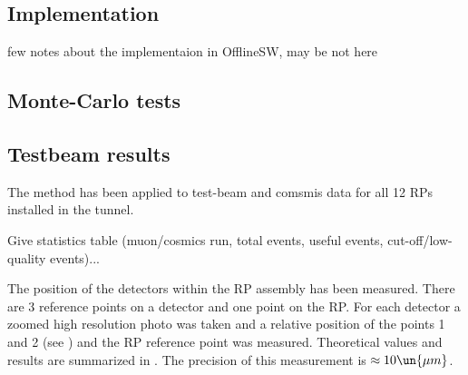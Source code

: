 \subsection{Implementation}

\> few notes about the implementaion in OfflineSW, may be not here

\subsection{Monte-Carlo tests}






\subsection{Testbeam results}

The method has been applied to test-beam and comsmis data for all 12 RPs installed in the tunnel.

Give statistics table (muon/cosmics run, total events, useful events, cut-off/low-quality events)...


The position of the detectors within the RP assembly has been measured. There are 3 reference points on a detector and one point on the RP. For each detector a zoomed high resolution photo was taken and a relative position of the points 1 and 2 (see ) and the RP reference point was measured. Theoretical values and results are summarized in . The precision of this measurement is $\approx 10\un{\mu m}$.



